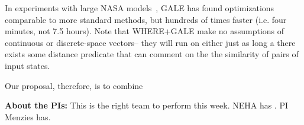 \documentclass[12pt]{article}
\begin{document}
In experiments with large NASA models~\cite{me15z}, GALE has found optimizations comparable to more standard methods, but hundreds of times faster (i.e. four minutes, not 7.5 hours). Note that WHERE+GALE make no assumptions of continuous or discrete-space vectors-- they
will run on either just as long a there exists some distance predicate that can comment on
the the similarity of pairs of input states.



Our proposal, therefore, is to combine 

{\bf About the PIs:} This is the right team to perform this week. NEHA has . PI Menzies has.


\newpage


\end{document}
